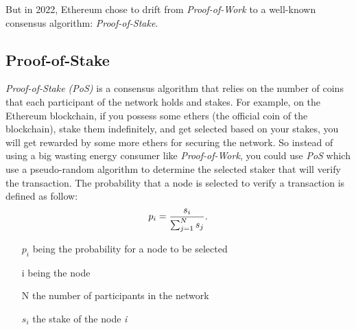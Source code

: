 \documentclass{ifacconf}
\begin{document}
But in 2022, Ethereum chose to drift from \textit{Proof-of-Work} to a  well-known consensus algorithm: \textit{Proof-of-Stake}.

\subsection{Proof-of-Stake}

\textit{Proof-of-Stake (PoS)} is a consensus algorithm that relies on the number of coins that each participant of the network holds and stakes. For example, on the Ethereum blockchain, if you possess some ethers (the official coin of the blockchain), stake them indefinitely, and get selected based on your stakes, you will get rewarded by some more ethers for securing the network. So instead of using a big wasting energy consumer like \textit{Proof-of-Work}, you could use \textit{PoS} which use a pseudo-random algorithm to determine the selected staker that will verify the transaction. The probability that a node is selected to verify a transaction is defined as follow:
\begin{equation} \label{eq:sample}
{p_{i}} = {{s_{i}}\over {\sum_{j=1}^{N} s_{j}}}.
\end{equation}
\begin{itemize}
    \item[$p_{i}$] being the probability for a node to be selected
    \item[i] being the node
    \item[N] the number of participants in the network
    \item[$s_{i}$] the stake of the node \textit{i}
\end{itemize}





\end{document}
